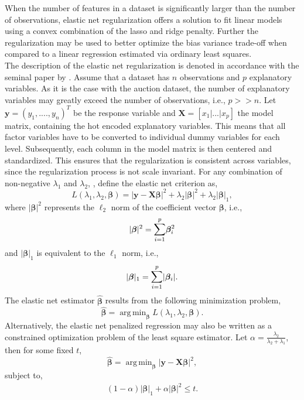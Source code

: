 \documentclass[a4paper,12pt, headsepline]{scrartcl}
\DeclareMathOperator*{\argminA}{arg\,min}
\numberwithin{equation}{section}
\begin{document}
When the number of features in a dataset is significantly larger than the number of observations, elastic net regularization offers a solution to fit linear models using a convex combination of the lasso and ridge penalty. Further the regularization may be used to better optimize the bias variance trade-off when compared to a linear regression estimated via ordinary least squares.\\
The description of the elastic net regularization is denoted in accordance with the seminal paper by \citet{hastie03}. Assume that a dataset has $n$ observations and $p$ explanatory variables. As it is the case with the auction dataset, the number of explanatory variables may greatly exceed the number of observations, i.e., $p >> n$. Let $\mathbf{y} = (y_1, ...., y_n)^T$ be the response variable and $\mathbf{X} = [x_1|...|x_p]$ the model matrix, containing the hot encoded explanatory variables. This means that all factor variables have to be converted to individual dummy variables for each level. Subsequently, each column in the model matrix is then centered and standardized. This ensures that the regularization is consistent across variables, since the regularization process is not scale invariant. For any combination of non-negative $\lambda_1$ and $\lambda_2$, \citet{hastie03}, define the elastic net criterion as,
\[
L(\lambda_1, \lambda_2, \bm{\beta}) = |\mathbf{y} - \mathbf{X}\bm{\beta}|^2 +\lambda_2|\bm{\beta}|^2 +\lambda_2|\bm{\beta}|_1, 
\]
where $|\bm{\beta}|^2$ represents the $\ell_2$ norm of the coefficient vector $\bm{\beta}$, i.e., 
\[
|\bm{\beta}|^2 = \mathlarger{\sum}\limits_{i = 1}^{p}\bm{\beta}_i^2
\]
and $|\bm{\beta}|_1$ is equivalent to the $\ell_1$ norm, i.e.,  
\[
|\bm{\beta}|_1 = \mathlarger{\sum}\limits_{i = 1}^{p}|\bm{\beta}_i|.
\]
The elastic net estimator $\bm{\hat{\beta}}$ results from the following minimization problem,
\[
\bm{\hat{\beta}} = \argminA_{\bm{\beta}} L(\lambda_1, \lambda_2, \bm{\beta}).
\]
Alternatively, the elastic net penalized regression may also be written as a constrained optimization problem of the least square estimator. Let $\alpha = \frac{\lambda_2}{\lambda_2 + \lambda_1}$, then for some fixed $t$, 
\[
\bm{\hat{\beta}} = \argminA_{\bm{\beta}} |\mathbf{y} - \mathbf{X}\bm{\beta}|^2,
\]
subject to,
\begin{gather}
(1 - \alpha)|\bm{\beta}|_1 + \alpha|\bm{\beta}|^2 \leq t.
\end{gather}
\end{document}
